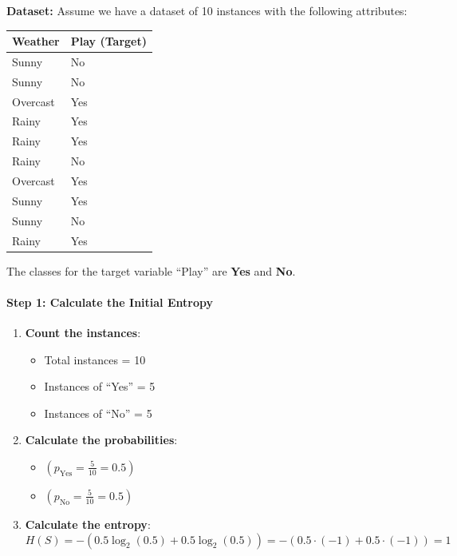 \documentclass[12pt]{book}
\providecommand{\tightlist}{%
  \setlength{\itemsep}{0pt}\setlength{\parskip}{0pt}}
\begin{document}
\textbf{Dataset:} Assume we have a dataset of 10 instances with the
following attributes:

\begin{longtable}[]{@{}ll@{}}
\toprule\noalign{}
Weather & Play (Target) \\
\midrule\noalign{}
\endhead
\bottomrule\noalign{}
\endlastfoot
Sunny & No \\ \hline
Sunny & No \\ \hline
Overcast & Yes \\ \hline
Rainy & Yes \\ \hline
Rainy & Yes \\ \hline
Rainy & No \\ \hline
Overcast & Yes \\ \hline
Sunny & Yes \\ \hline
Sunny & No \\ \hline
Rainy & Yes \\ \hline
\end{longtable}

The classes for the target variable ``Play'' are \textbf{Yes} and
\textbf{No}.

\paragraph{Step 1: Calculate the Initial
Entropy}\label{step-1-calculate-the-initial-entropy}

\begin{enumerate}
\def\labelenumi{\arabic{enumi}.}
\tightlist
\item
  \textbf{Count the instances}:

  \begin{itemize}
  \tightlist
  \item
    Total instances = 10
  \item
    Instances of ``Yes'' = 5
  \item
    Instances of ``No'' = 5
  \end{itemize}
\item
  \textbf{Calculate the probabilities}:

  \begin{itemize}
  \tightlist
  \item
    \(( p_{\text{Yes}} = \frac{5}{10} = 0.5 )\)
  \item
    \(( p_{\text{No}} = \frac{5}{10} = 0.5 )\)
  \end{itemize}
\item
  \textbf{Calculate the entropy}: \[
  H(S) = -\left(0.5 \log_2(0.5) + 0.5 \log_2(0.5)\right) = -\left(0.5 \cdot (-1) + 0.5 \cdot (-1)\right) = 1
  \]
\end{enumerate}
\end{document}
